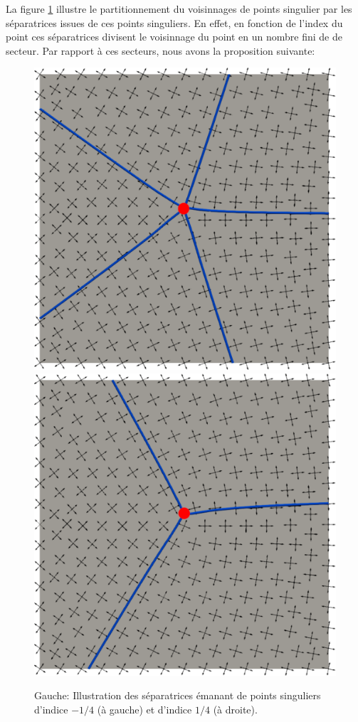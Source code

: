 La figure \ref{fig:separatrice_illustration} illustre le partitionnement du voisinnages de points singulier par les séparatrices issues de ces points singuliers. En effet, en fonction de l'index du point ces séparatrices divisent le voisinnage du point en un nombre fini de de secteur. Par rapport à ces secteurs, nous avons la proposition suivante:
\begin{figure}[!h]
  \centering
  \includegraphics[scale=0.27]{images/sepa_5.pdf}\hspace{0.2cm}
  \includegraphics[scale=0.27]{images/sepa_3.pdf}
  \caption{Gauche: Illustration des séparatrices émanant de points singuliers d'indice $-1/4$ (à gauche) et d'indice $1/4$ (à droite).}
  \label{fig:separatrice_illustration}
\end{figure}


